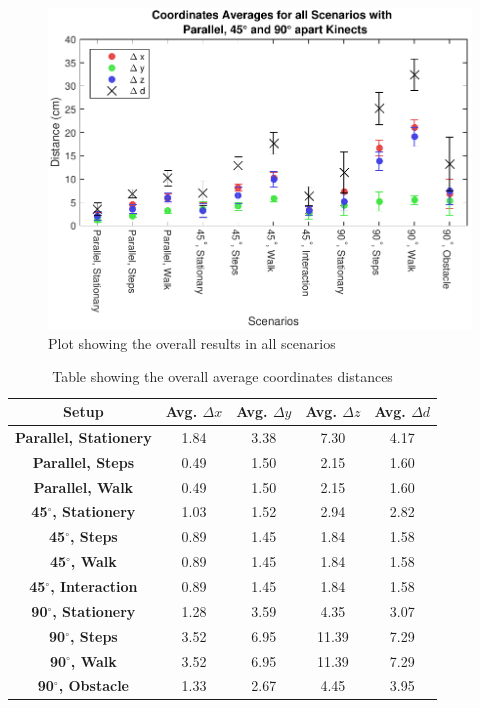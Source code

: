\begin{figure}[!h]
  \centering

  \includegraphics[width=0.8\linewidth]{figs/Coordinates_All}

  \caption{Plot showing the overall results in all scenarios}

  \label{fig:results_overall}
\end{figure}

\begin{table}[!h]
  \centering

  \begin{tabulary}{0.5\linewidth}{||c c c c c||} 
  \hline
  \textbf{Setup} & Avg. $\Delta x$ & Avg. $\Delta y$ & Avg. $\Delta z$ & Avg. $\Delta d$ \\ [0.5ex] 
  \hline\hline
  \textbf{Parallel, Stationery} & 1.84 & 3.38 & 7.30 & 4.17 \\
  \hline
  \textbf{Parallel, Steps} & 0.49 & 1.50 & 2.15 & 1.60 \\
  \hline
  \textbf{Parallel, Walk} & 0.49 & 1.50 & 2.15 & 1.60 \\
  \hline
  \textbf{45$^{\circ}$, Stationery} & 1.03 & 1.52 & 2.94 & 2.82 \\
  \hline
  \textbf{45$^{\circ}$, Steps} & 0.89 & 1.45 & 1.84 & 1.58 \\
  \hline
  \textbf{45$^{\circ}$, Walk} & 0.89 & 1.45 & 1.84 & 1.58 \\
  \hline
  \textbf{45$^{\circ}$, Interaction} & 0.89 & 1.45 & 1.84 & 1.58 \\
  \hline
  \textbf{90$^{\circ}$, Stationery} & 1.28 & 3.59 & 4.35 & 3.07 \\
  \hline
  \textbf{90$^{\circ}$, Steps} & 3.52 & 6.95 & 11.39 & 7.29 \\
  \hline
  \textbf{90$^{\circ}$, Walk} & 3.52 & 6.95 & 11.39 & 7.29 \\
  \hline
  \textbf{90$^{\circ}$, Obstacle} & 1.33 & 2.67 & 4.45 & 3.95 \\
  \hline
  \end{tabulary}
  
  \caption{Table showing the overall average coordinates distances}
  
  \label{table:overall_coordinates_values}
\end{table}


